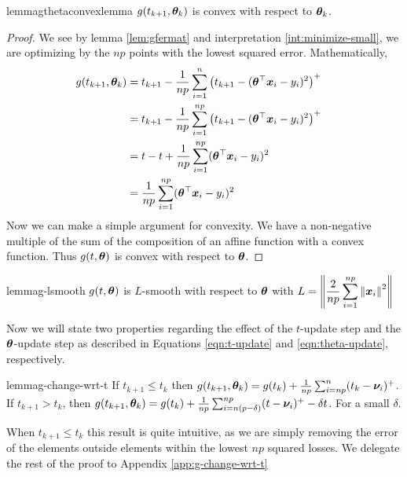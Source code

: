 \documentclass{article} %
\newenvironment{proofsketch}{%
	\renewcommand{\proofname}{Proof Sketch}\proof}{\endproof}
\newcommand{\norm}[1]{\left\lVert#1\right\rVert}
\begin{document}
		
	\begin{restatable}{lemma}{gthetaconvexlemma}
		\label{lem:gthetaconvex}
		$g(t_{k+1},{\bm{\theta}}_k)$ is convex with respect to ${\bm{\theta}}_k$.
	\end{restatable}
	\begin{proof}
		We see by lemma \ref{lem:gfermat} and interpretation \ref{int:minimize-small}, we are optimizing by the $np$ points with the lowest squared error. Mathematically, 
		\begin{align}
			g(t_{k+1},{\bm{\theta}}_k) &= t_{k+1} - \frac{1}{np}\sum_{i=1}^{n}\left(t_{k+1} - ({\bm{\theta}}^\top{\bm{x}}_i - y_i)^2\right)^+ &&\\
			&= t_{k+1} - \frac{1}{np}\sum_{i=1}^{np}\left(t_{k+1} - ({\bm{\theta}}^\top{\bm{x}}_i - y_i)^2\right)^+ &&\\
			&= t - t + \frac{1}{np}\sum_{i=1}^{np}({\bm{\theta}}^\top{\bm{x}}_i - y_i)^2 &&\\
			&= \frac{1}{np}\sum_{i=1}^{np}({\bm{\theta}}^\top{\bm{x}}_i - y_i)^2 &&
		\end{align}
		Now we can make a simple argument for convexity. We have a non-negative multiple of the sum of the composition of an affine function with a convex function. Thus $g(t,{\bm{\theta}})$ is convex with respect to ${\bm{\theta}}$.
	\end{proof}
	
	\begin{restatable}{lemma}{g-lsmooth}
		\label{lem:g-lsmooth}
		$g(t,{\bm{\theta}})$ is $L$-smooth with respect to ${\bm{\theta}}$ with $\displaystyle L = \norm{\frac{2}{np}\sum_{i=1}^{np}\norm{\vx_i}^2}$ 
	\end{restatable}
	
	Now we will state two properties regarding the effect of the $t$-update step and the ${\bm{\theta}}$-update step as described in Equations \ref{eqn:t-update} and \ref{eqn:theta-update}, respectively. 
	\begin{restatable}{lemma}{g-change-wrt-t}
		\label{lem:g-change-wrt-t}
		If $t_{k+1} \leq t_k$ then $ g(t_{k+1},{\bm{\theta}}_k) = g(t_{k}) + \frac{1}{np}\sum_{i=np}^n(t_k - {\bm{\nu}}_i)^+$. If $t_{k+1} > t_k$, then $ g(t_{k+1},{\bm{\theta}}_k) = g(t_k) + \frac{1}{np}\sum_{i=n(p-\delta)}^{np}(t-{\bm{\nu}}_i)^+  - \delta t$. For a small $\delta$. 
	\end{restatable}
	\begin{proofsketch}
		When $t_{k+1} \leq t_k$ this result is quite intuitive, as we are simply removing the error of the elements outside elements within the lowest $np$ squared losses. We delegate the rest of the proof to Appendix \ref{app:g-change-wrt-t}
	\end{proofsketch}
\end{document}
